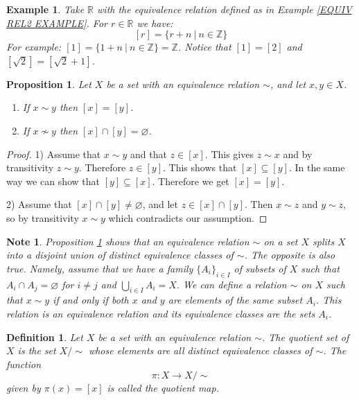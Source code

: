 \documentclass[11pt, letterpaper, oneside]{report}
\theoremstyle{pplain}
\newtheorem{proposition}[theorem]{Proposition}
\newtheorem{ITERMVALUE THM}[theorem]{Intermediate Value Theorem}
\newtheorem{HEINEBOREL THM}[theorem]{Heine-Borel Theorem}
\newtheorem{UMETR THM}[theorem]{Urysohn Metrization Theorem}
\newtheorem{UMETR2 THM}[theorem]{Urysohn Metrization Theorem (v.2)}
\theoremstyle{ddefinition}
\newtheorem{definition}[theorem]{Definition}
\newtheorem{example}[theorem]{Example}
\newtheorem{note}[theorem]{Note}
\theoremstyle{nnn}
\newtheorem{TDA NN}[theorem]{Topological Data Analysis. }
\theoremstyle{eexercise}
\newcommand{\Z}{{\mathbb Z}}
\newcommand{\R}{{\mathbb R}}
\newcommand{\benu}{\begin{enumerate}}
\newcommand{\eenu}{\end{enumerate}}
\begin{document}
\begin{example}
Take $\R$ with the equivalence relation defined as in Example \ref{EQUIV REL2 EXAMPLE}. 
For $r\in \R$ we have:
$$[r] = \{r+n \ | \ n\in \Z\}$$
For example: $[1] = \{ 1+n \ | \ n\in \Z \} = \Z$. Notice that $[1] = [2] $ and 
$[\sqrt{2}] = [\sqrt{2}+1]$. 
\end{example}

\begin{proposition}
\label{EQUIV CLASSES PROP}
Let $X$ be a set with an equivalence relation $\sim$, and let  $x, y\in X$. 
\benu
\item[1)] If $x\sim y$ then  $[x]=[y]$.
\item[2)] If $x\not\sim y$ then $[x]\cap [y]  = \varnothing$.
 \eenu
\end{proposition}

\begin{proof}
1) Assume that $x\sim y$ and that $z\in [x]$. This gives $z\sim x$ and by transitivity $z\sim y$. 
Therefore $z\in [y]$. This shows that $[x]\subseteq [y]$. In the same way we can show that $[y]\subseteq [x]$. 
Therefore we get $[x]=[y]$.

2) Assume that  $[x]\cap [y]  \neq \varnothing$, and let $z \in [x]\cap [y]$. 
Then $x\sim z$ and $y\sim z$,  so by transitivity $x\sim y$ which contradicts our assumption. 
\end{proof}


\begin{note}
Proposition \ref{EQUIV CLASSES PROP} shows that an equivalence 
relation $\sim$ on a set $X$ splits $X$ into a disjoint union of distinct equivalence classes of $\sim$. 
The opposite is also true. Namely, assume that we have a family $\{A_{i}\}_{i\in I}$ of subsets of $X$ 
such that $A_{i}\cap A_{j} = \varnothing$ for $i\neq j$ and  $\bigcup_{i\in I}A_{i} = X$.  We can define 
a relation $\sim$ on $X$ such that $x\sim y$ if and only if both $x$ and $y$ are elements of the same subset $A_{i}$. 
This relation is an equivalence relation and its equivalence classes are the sets $A_{i}$. 
\end{note}

\begin{definition}
Let $X$ be a set with an equivalence relation $\sim$. The \emph{quotient set} of $X$ is the set 
$X/{\sim}$ whose elements are all distinct equivalence classes of $\sim$. The function 
$$\pi \colon X \to X/{\sim}$$
given by $\pi(x) = [x]$ is called the \emph{quotient map}. 
\end{definition}
\end{document}
